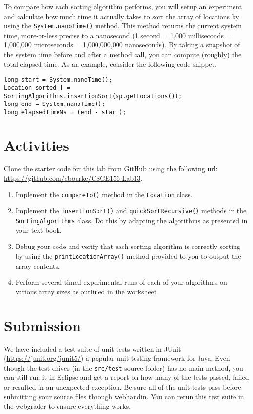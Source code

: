 \documentclass[12pt]{scrartcl}
\begin{document}
To compare how each sorting algorithm performs, you will setup an 
experiment and calculate how much time it actually takes to sort the 
array of locations by using the \texttt{System.nanoTime()} 
method.  This method returns the current system time, more-or-less 
precise to a nanosecond (1 second = 1,000 milliseconds = 1,000,000 
microseconds = 1,000,000,000 nanoseconds).  By taking a snapshot of 
the system time before and after a method call, you can compute 
(roughly) the total elapsed time.  As an example, consider the 
following code snippet.

\begin{verbatim}
long start = System.nanoTime();
Location sorted[] = SortingAlgorithms.insertionSort(sp.getLocations());
long end = System.nanoTime();
long elapsedTimeNs = (end - start);
\end{verbatim}

\section*{Activities}

Clone the starter code for this lab from GitHub using the following
url: \url{https://github.com/cbourke/CSCE156-Lab13}.

\begin{enumerate}
  \item Implement the \texttt{compareTo()} method in the 
    \texttt{Location} class.
  \item Implement the \texttt{insertionSort()} and 
    \texttt{quickSortRecursive()} methods in the 
    \texttt{SortingAlgorithms} class.  Do this by adapting 
    the algorithms as presented in your text book.
  \item Debug your code and verify that each sorting algorithm is 
    correctly sorting by using the \texttt{printLocationArray()} 
    method provided to you to output the array contents. 
  \item Perform several timed experimental runs of each of your 
    algorithms on various array sizes as outlined in the worksheet
\end{enumerate}


\section*{Submission}

We have included a test suite of unit tests written in JUnit 
(\url{https://junit.org/junit5/}) a popular unit testing framework for
Java.  Even though the test driver (in the \texttt{src/test}
source folder) has no main method, you can still run it in Eclipse and
get a report on how many of the tests passed, failed or resulted in 
an unexpected exception.  Be sure all of the unit tests pass before
submitting your source files through webhandin.  You can rerun this
test suite in the webgrader to ensure everything works.  
\end{document}
